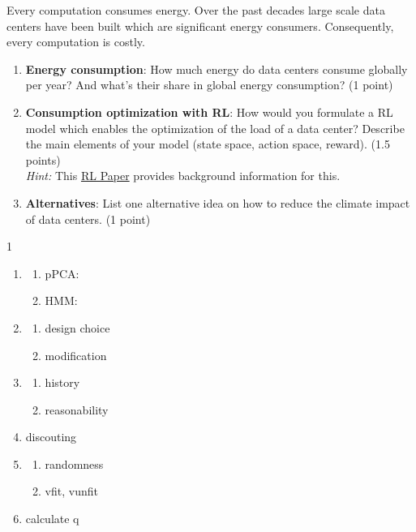 \documentclass[submit]{harvardml}
\begin{document}
\newpage
\begin{problem}
Every computation consumes energy. Over the past decades large scale data centers have been built which are significant energy consumers. Consequently, every computation is costly.  

\begin{enumerate}
    \item \textbf{Energy consumption}: How much energy do data centers consume globally per year? And what's their share in global energy consumption? (1 point)
    \item \textbf{Consumption optimization with RL}: How would you formulate a RL model which enables the optimization of the load of a data center? Describe the main elements of your model (state space, action space, reward). (1.5 points)\\
   \textit{Hint:} This \href{https://people.csail.mit.edu/alizadeh/papers/deeprm-hotnets16.pdf}{RL Paper} provides background information for this.
   \item \textbf{Alternatives}: List one alternative idea on how to reduce the climate impact of data centers. (1 point)
\end{enumerate}
\end{problem}
    
\newpage
\begin{sol}{}{1}
  \begin{center}
    \begin{enumerate}
        \item \begin{enumerate}
            \item pPCA:
            \item HMM:
        \end{enumerate}
        \item \begin{enumerate}
            \item design choice
            \item modification
        \end{enumerate}
        \item \begin{enumerate}
            \item history
            \item reasonability
        \end{enumerate}
        \item discouting
        \item \begin{enumerate}
            \item randomness
            \item vfit, vunfit
        \end{enumerate}
        \item calculate q
    \end{enumerate}
  \end{center}
\end{sol}
\end{document}

